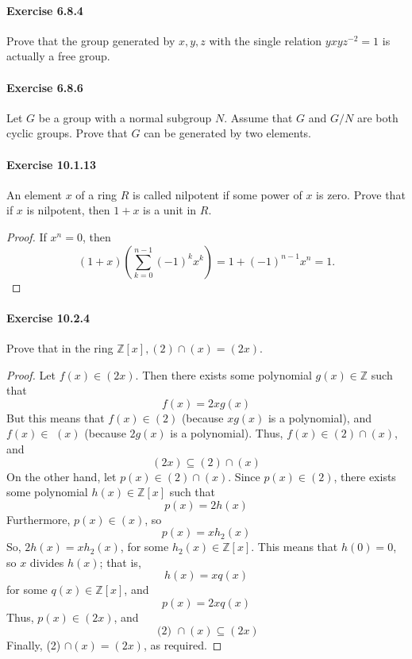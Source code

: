 \documentclass{article}
\begin{document}
\paragraph{Exercise 6.8.4} Prove that the group generated by $x, y, z$ with the single relation $y x y z^{-2}=1$ is actually a free group.


\paragraph{Exercise 6.8.6} Let $G$ be a group with a normal subgroup $N$. Assume that $G$ and $G / N$ are both cyclic groups. Prove that $G$ can be generated by two elements.


\paragraph{Exercise 10.1.13} An element $x$ of a ring $R$ is called nilpotent if some power of $x$ is zero. Prove that if $x$ is nilpotent, then $1+x$ is a unit in $R$.
\begin{proof}
    If $x^n=0$, then
$$
(1+x)\left(\sum_{k=0}^{n-1}(-1)^k x^k\right)=1+(-1)^{n-1} x^n=1 .
$$
\end{proof}



\paragraph{Exercise 10.2.4} Prove that in the ring $\mathbb{Z}[x],(2) \cap(x)=(2 x)$.
\begin{proof}
    Let $f(x) \in(2 x)$. Then there exists some polynomial $g(x) \in \mathbb{Z}$ such that
$$
f(x)=2 x g(x)
$$
But this means that $f(x) \in(2)$ (because $x g(x)$ is a polynomial), and $f(x) \in$ $(x)$ (because $2 g(x)$ is a polynomial). Thus, $f(x) \in(2) \cap(x)$, and
$$
(2 x) \subseteq(2) \cap(x)
$$
On the other hand, let $p(x) \in(2) \cap(x)$. Since $p(x) \in(2)$, there exists some polynomial $h(x) \in \mathbb{Z}[x]$ such that
$$
p(x)=2 h(x)
$$
Furthermore, $p(x) \in(x)$, so
$$
p(x)=x h_2(x)
$$
So, $2 h(x)=x h_2(x)$, for some $h_2(x) \in \mathbb{Z}[x]$. This means that $h(0)=0$, so $x$ divides $h(x)$; that is,
$$
h(x)=x q(x)
$$
for some $q(x) \in \mathbb{Z}[x]$, and
$$
p(x)=2 x q(x)
$$
Thus, $p(x) \in(2 x)$, and
$$
\text { (2) } \cap(x) \subseteq(2 x)
$$
Finally,
(2) $\cap(x)=(2 x)$,
as required.
\end{proof}
\end{document}
